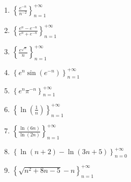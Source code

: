 \documentclass[12pt]{article}
\newif\ifans
\begin{document}
\begin{enumerate}
\item $\left\{ \frac{e^{-n}}{n^{-2}} \right\}_{n = 1}^{+\infty}$

\ifans{\fbox{Converges to $0$.}} \fi

\item $\left\{ \frac{e^n-e^{-n}}{e^n+e^{-n}} \right\}_{n = 1}^{+\infty}$

\ifans{\fbox{Converges to $1$.  See \underline{Limits at Infinity Review} problem \#5.; Detailed Solution: \textcolor{blue}{\href{http://www.math.drexel.edu/classes/Calculus/resources/Math123HW/Solutions/123_05_Sequences_21.pdf}{Here}}}} \fi


\item $\left\{ \frac{e^{\sqrt{n}}}{n} \right\}_{n = 1}^{+\infty}$

\ifans{\fbox{Diverges to $+\infty$.}} \fi

\item $\left\{e^n \sin(e^{-n}) \right\}_{n = 1}^{+\infty}$ 

\ifans{\fbox{Converges to $1$.}} \fi

\item $\left\{ e^n \pi^{-n} \right\}_{n = 1}^{+\infty}$

\ifans{\fbox{Converges to $0$.}} \fi

\item $\left\{ \ln{\left(\frac{1}{n}\right)} \right\}_{n = 1}^{+\infty}$

\ifans{\fbox{Diverges to $-\infty$.}} \fi

\item $\left\{ \frac{\ln{(6n)}}{\ln{(2n)}} \right\}_{n = 1}^{+\infty}$

\ifans{\fbox{Converges to $1$.; Detailed Solution: \textcolor{blue}{\href{http://www.math.drexel.edu/classes/Calculus/resources/Math123HW/Solutions/123_05_Sequences_26.pdf}{Here}}}} \fi

\item $\left\{ \ln{(n+2)} - \ln{(3n+5)} \right\}_{n = 0}^{+\infty}$

\ifans{\fbox{Converges to $\ln{\left(\frac{1}{3}\right)}$.}} \fi

\item $\left\{ \sqrt{n^2+8n-5}-n \right\}_{n = 1}^{+\infty}$

\ifans{\fbox{Converges to $4$.  See \underline{Limits at Infinity Review} problem \#4.; Detailed Solution: \textcolor{blue}{\href{http://www.math.drexel.edu/classes/Calculus/resources/Math123HW/Solutions/123_05_Sequences_28.pdf}{Here}}}} \fi



\end{enumerate}
\end{document}
